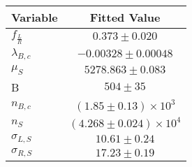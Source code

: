 \begin{tabular}[t]{lc}
\hline
Variable &Fitted Value\\
\hline\hline
$f_{\frac{L}{R}}$&$0.373\pm0.020$\\
\hline
$\lambda_{B,c}$&$-0.00328\pm0.00048$\\
\hline
$\mu_S$&$5278.863\pm0.083$\\
\hline
B&$504\pm35$\\
\hline
$n_{B,c}$&$(1.85\pm0.13)\times 10^3$\\
\hline
$n_S$&$(4.268\pm0.024)\times 10^4$\\
\hline
$\sigma_{L, S}$&$10.61\pm0.24$\\
\hline
$\sigma_{R, S}$&$17.23\pm0.19$\\
\hline
\end{tabular}